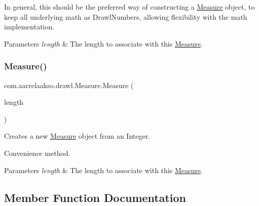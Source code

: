 In general, this should be the preferred way of constructing a \hyperlink{classcom_1_1aarrelaakso_1_1drawl_1_1_measure}{Measure} object, to keep all underlying math as Drawl\+Numbers, allowing flexibility with the math implementation.


\begin{DoxyParams}{Parameters}
{\em length} & The length to associate with this \hyperlink{classcom_1_1aarrelaakso_1_1drawl_1_1_measure}{Measure}. \\
\hline
\end{DoxyParams}
\mbox{\label{classcom_1_1aarrelaakso_1_1drawl_1_1_measure_a1960447b4b9dc0f4e71a2b86af31c52c}} 
\subsubsection{\texorpdfstring{Measure()}{Measure()}\hspace{0.1cm}{\footnotesize\ttfamily [2/2]}}
{\footnotesize\ttfamily com.\+aarrelaakso.\+drawl.\+Measure.\+Measure (\begin{DoxyParamCaption}\item[{@Not\+Null final Integer}]{length }\end{DoxyParamCaption})}



Creates a new \hyperlink{classcom_1_1aarrelaakso_1_1drawl_1_1_measure}{Measure} object from an Integer. 

Convenience method.


\begin{DoxyParams}{Parameters}
{\em length} & The length to associate with this \hyperlink{classcom_1_1aarrelaakso_1_1drawl_1_1_measure}{Measure}. \\
\hline
\end{DoxyParams}


\subsection{Member Function Documentation}
\mbox{\label{classcom_1_1aarrelaakso_1_1drawl_1_1_measure_a02dc28edb78877bfc79eabe63ddde6f3}} 
